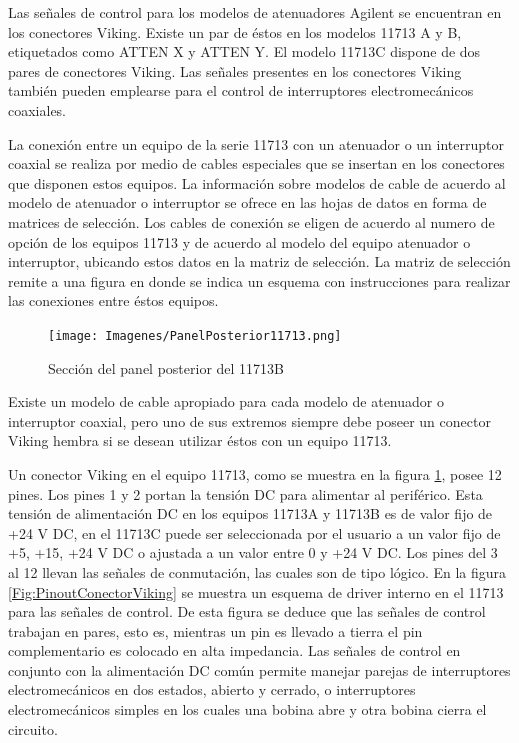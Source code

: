 Las señales de control para los modelos de atenuadores Agilent se encuentran en los conectores Viking. Existe un par de éstos en los modelos 11713 A y B, etiquetados como ATTEN X y ATTEN Y. El modelo 11713C dispone de dos pares de conectores Viking. Las señales presentes en los conectores Viking también pueden emplearse para el control de interruptores electromecánicos coaxiales.

La conexión entre un equipo de la serie 11713 con un atenuador o un interruptor coaxial se realiza por medio de cables	especiales que se insertan en los conectores que disponen estos equipos. La información sobre modelos de cable de acuerdo al modelo de atenuador o interruptor se ofrece en las hojas de datos en forma de matrices de selección. Los cables de conexión se eligen de acuerdo al numero de opción de los equipos 11713 y de acuerdo al modelo del equipo	atenuador o interruptor, ubicando estos datos en la matriz de selección. La matriz de selección remite a una figura en
donde se indica un esquema con instrucciones para realizar las conexiones entre éstos equipos. 

\begin{figure}
	\centering
	\begin{minipage}{17.157cm}
		\texttt{[image: Imagenes/PanelPosterior11713.png]}
		\caption{Sección del panel posterior del 11713B}
		\label{Fig:PanelPosterior11713}
	\end{minipage}
\end{figure}

Existe un modelo de cable apropiado para cada modelo de atenuador o interruptor coaxial, pero uno de sus extremos siempre debe poseer un conector Viking hembra si se desean utilizar éstos con un equipo 11713. 

Un conector Viking en el equipo 11713, como se muestra en la figura \ref{Fig:PanelPosterior11713},  posee 12 pines. Los pines 1 y 2 portan la tensión DC para alimentar al periférico. Esta tensión de alimentación DC en los equipos 11713A y	11713B es de valor fijo de +24 V DC, en el 11713C puede ser seleccionada por el usuario a un valor fijo de +5, +15, +24	V DC o ajustada a un valor entre 0 y +24 V DC. Los pines del 3 al 12 llevan las señales de conmutación, las cuales son de tipo lógico. En la figura \ref{Fig:PinoutConectorViking} se muestra un esquema de driver interno en el 11713 para las señales	de control. De esta figura se deduce que las señales de control trabajan en pares, esto es, mientras un pin es llevado a tierra el pin complementario es colocado en alta impedancia. Las señales de control en conjunto con la alimentación DC común permite manejar parejas de interruptores electromecánicos en dos estados, abierto y cerrado, o interruptores electromecánicos simples en los cuales una bobina abre y otra bobina cierra el circuito.		

